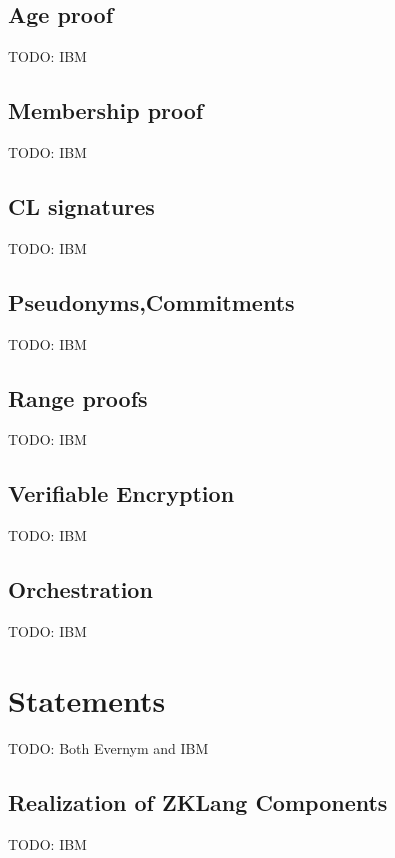 \documentclass[a4paper]{article}
\begin{document}
\subsection{Age proof}
TODO: IBM

\subsection{Membership proof}
TODO: IBM

\subsection{CL signatures}
TODO: IBM

\subsection{Pseudonyms,Commitments}
TODO: IBM

\subsection{Range proofs}
TODO: IBM

\subsection{Verifiable Encryption}
TODO: IBM

\subsection{Orchestration}
TODO: IBM

\section{Statements}
TODO: Both Evernym and IBM

%

\subsection{Realization of ZKLang Components}
TODO: IBM
\end{document}
